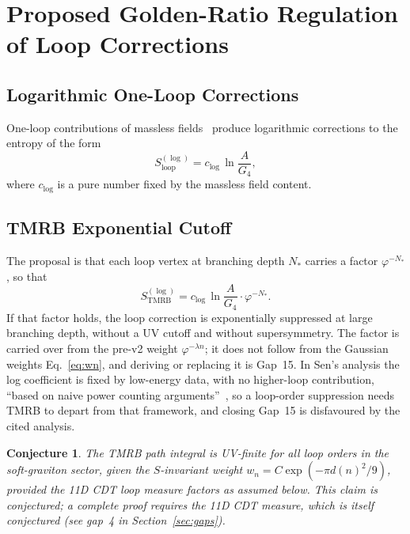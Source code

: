 \documentclass[11pt,a4paper]{article}
\newtheorem{conjecture}[theorem]{Conjecture}
\begin{document}
\section{Proposed Golden-Ratio Regulation of Loop Corrections}
\label{sec:loop}

\subsection{Logarithmic One-Loop Corrections}

One-loop contributions of massless fields~\cite{Sen2012} produce logarithmic corrections to the
entropy of the form
\begin{equation}
  S^{(\log)}_{\mathrm{loop}} = c_{\log}\,\ln\!\frac{A}{G_4},
  \label{eq:log_loop}
\end{equation}
where $c_{\log}$ is a pure number fixed by the massless field content.

\subsection{TMRB Exponential Cutoff}

The proposal is that each loop vertex at branching depth $N_*$ carries a factor
$\varphi^{-N_*}$, so that
\begin{equation}
  S_{\mathrm{TMRB}}^{(\log)} = c_{\log}\,\ln\!\frac{A}{G_4}\cdot\varphi^{-N_*}.
  \label{eq:regulated_loop}
\end{equation}
If that factor holds, the loop correction is exponentially suppressed at large
branching depth, without a UV cutoff and without supersymmetry. The factor is
carried over from the pre-v2 weight $\varphi^{-\lambda n}$; it does not follow from
the Gaussian weights Eq.~\eqref{eq:wn}, and deriving or replacing it is Gap~15.
In Sen's analysis the log coefficient is fixed by low-energy data, with no higher-loop contribution, ``based on naive power counting arguments''~\cite{Sen2012}, so a loop-order suppression needs TMRB to depart from that framework, and closing Gap~15 is disfavoured by the cited analysis.

\begin{conjecture}
The TMRB path integral is UV-finite for all loop orders in the soft-graviton
sector, given the $S$-invariant weight $w_n = C\exp(-\pi d(n)^2/9)$,
\emph{provided} the 11D CDT loop measure factors as assumed below.
This claim is conjectured; a complete proof requires the 11D CDT measure,
which is itself conjectured (see gap~4 in Section~\ref{sec:gaps}).
\end{conjecture}
\end{document}
